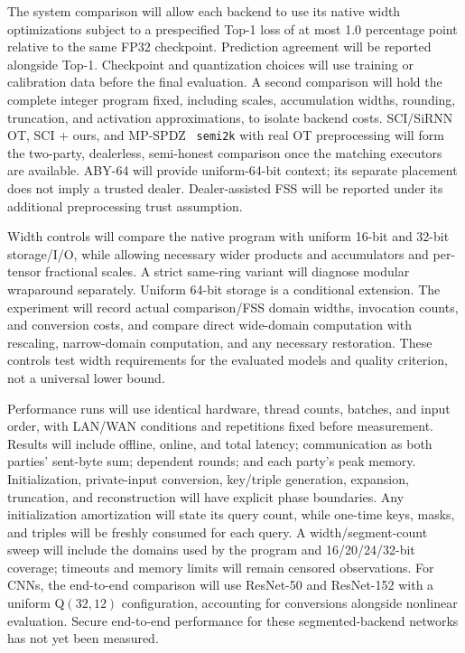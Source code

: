 \documentclass[journal]{IEEEtran}
\theoremstyle{definition}
\theoremstyle{plain}
\begin{document}
The system comparison will allow each backend to use its native width
optimizations subject to a prespecified Top-1 loss of at most 1.0 percentage
point relative to the same FP32 checkpoint. Prediction agreement will be
reported alongside Top-1. Checkpoint and quantization choices will use training
or calibration data before the final evaluation. A second comparison will hold
the complete integer program fixed, including scales, accumulation widths,
rounding, truncation, and activation approximations, to isolate backend costs.
SCI/SiRNN OT, SCI + ours, and MP-SPDZ~\cite{mpspdz} \texttt{semi2k} with real OT preprocessing
will form the two-party, dealerless, semi-honest comparison once the matching
executors are available. ABY-64 will provide uniform-64-bit context; its separate
placement does not imply a trusted dealer. Dealer-assisted FSS will be reported
under its additional preprocessing trust assumption.

Width controls will compare the native program with uniform 16-bit and 32-bit
storage/I/O, while allowing necessary wider products and accumulators and
per-tensor fractional scales. A strict same-ring variant will diagnose modular
wraparound separately. Uniform 64-bit storage is a conditional extension.
The experiment will record actual comparison/FSS domain widths, invocation
counts, and conversion costs, and compare direct wide-domain computation with
rescaling, narrow-domain computation, and any necessary restoration. These
controls test width requirements for the evaluated models and quality criterion,
not a universal lower bound.

Performance runs will use identical hardware, thread counts, batches, and
input order, with LAN/WAN conditions and repetitions fixed before measurement.
Results will include offline, online, and total latency; communication as both
parties' sent-byte sum; dependent rounds; and each party's peak memory.
Initialization, private-input conversion, key/triple generation, expansion,
truncation, and reconstruction will have explicit phase boundaries. Any
initialization amortization will state its query count, while one-time keys,
masks, and triples will be freshly consumed for each query. A width/segment-count
sweep will include the domains used by the program and 16/20/24/32-bit coverage;
timeouts and memory limits will remain censored observations. For CNNs, the
end-to-end comparison will use ResNet-50 and ResNet-152 with a uniform
Q$(32,12)$ configuration, accounting for conversions alongside nonlinear
evaluation. Secure end-to-end performance for these segmented-backend networks
has not yet been measured.
\end{document}
